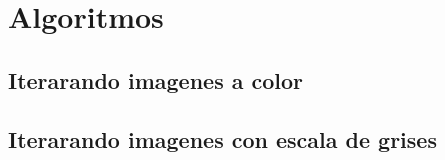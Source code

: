 \section{Algoritmos}
\subsection{Iterarando imagenes a color}

\subsection{Iterarando imagenes con escala de grises}

